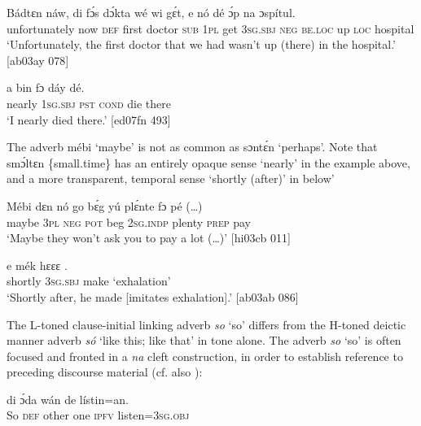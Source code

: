\ea%
    \label{ex:key:847}
    \gll Bádtɛn      náw,  di  fɔ́s  dɔ́kta  wé  wi  gɛ́t, 
e    nó  dé   ɔ́p  na  ɔspítul.\\
unfortunately  now    \textsc{def}  first  doctor  \textsc{sub}  \textsc{1pl}  get
\textsc{3sg.sbj}  \textsc{neg}  \textsc{be.loc} up  \textsc{loc}  hospital\\

\glt ‘Unfortunately, the first doctor that we had wasn’t up 
(there) in the hospital.’ [ab03ay 078]
\z


\ea%
    \label{ex:key:848}
    \gll {}   a    bin  fɔ    dáy  dé.\\
nearly    \textsc{1sg.sbj}  \textsc{pst}  \textsc{cond}    die  there\\

\glt ‘I nearly died there.’  [ed07fn 493]
\z

The adverb mébi ‘maybe’  is not as common as sɔntɛ́n ‘perhaps’. Note that smɔ́ltɛn \{small.time\} has an entirely opaque sense ‘nearly’ in the example above, and a more transparent, temporal sense ‘shortly (after)’ in  below’


\ea%
    \label{ex:key:849}
    \gll Mébi  dɛn  nó  go  bɛ́g  yú    plɛ́nte  fɔ  pé  (…)\\
maybe  \textsc{3pl}  \textsc{neg}  \textsc{pot}  beg  \textsc{2sg.indp}  plenty  \textsc{prep}  pay\\

\glt ‘Maybe they won’t ask you to pay a lot (…)’ [hi03cb 011]
\z


\ea%
    \label{ex:key:850}
    \gll {}   e    mék    hɛɛɛ  .\\
shortly    \textsc{3sg.sbj}  make  ‘exhalation’\\

\glt ‘Shortly after, he made [imitates exhalation].’ [ab03ab 086]
\z

The L-toned clause-initial linking adverb \textit{so} ‘so’  differs from the H-toned deictic manner adverb \textit{só} ‘like this; like that’  in tone alone. The adverb \textit{so} ‘so’ is often focused and fronted in a \textit{na} cleft construction, in order to establish reference to preceding discourse material  (cf. also ):


\ea%
    \label{ex:key:851}
    \gll {}  di  ɔ́da    wán    de  lístin=an.\\
So  \textsc{def}  other  one    \textsc{ipfv}  listen=\textsc{3sg.obj}\\

